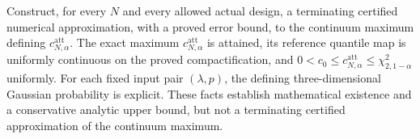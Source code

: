 Construct, for every \(N\) and every allowed actual design, a terminating certified numerical approximation, with a proved error bound, to the continuum maximum defining \(c_{N,\alpha}^{\mathrm{att}}\).
The exact maximum \(c_{N,\alpha}^{\mathrm{att}}\) is attained, its reference quantile map is uniformly continuous on the proved compactification, and \(0<c_0\le c_{N,\alpha}^{\mathrm{att}}\le\chi^2_{2,1-\alpha}\) uniformly. For each fixed input pair \((\lambda,p)\), the defining three-dimensional Gaussian probability is explicit. These facts establish mathematical existence and a conservative analytic upper bound, but not a terminating certified approximation of the continuum maximum.
